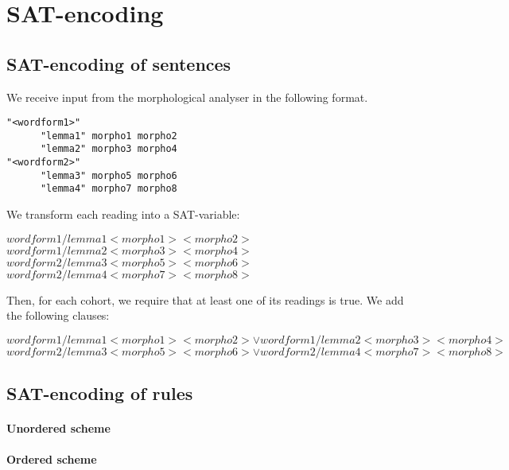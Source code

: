 \appendix
\chapter{SAT-encoding}

\section{SAT-encoding of sentences}

We receive input from the morphological analyser in the following format.

\begin{verbatim}
"<wordform1>"
      "lemma1" morpho1 morpho2
      "lemma2" morpho3 morpho4
"<wordform2>"
      "lemma3" morpho5 morpho6
      "lemma4" morpho7 morpho8
\end{verbatim}

We transform each reading into a SAT-variable:

\begin{centering}
$wordform1/lemma1<morpho1><morpho2>$
$wordform1/lemma2<morpho3><morpho4>$
$wordform2/lemma3<morpho5><morpho6>$
$wordform2/lemma4<morpho7><morpho8>$
\end{centering}

Then, for each cohort, we require that at least one of its readings is true. We add the following clauses:

\begin{centering}
$wordform1/lemma1<morpho1><morpho2> \vee wordform1/lemma2<morpho3><morpho4>$
$wordform2/lemma3<morpho5><morpho6> \vee wordform2/lemma4<morpho7><morpho8>$
\end{centering}



\section{SAT-encoding of rules}

\subsubsection{Unordered scheme}

\subsubsection{Ordered scheme}
